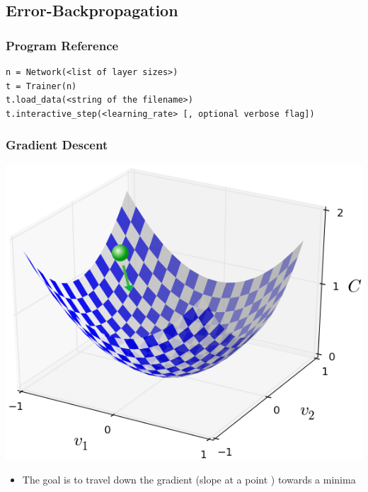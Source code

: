 \documentclass{beamer}
\makeatletter
\newcommand{\verbatimfont}[1]{\renewcommand{\verbatim@font}{\ttfamily#1}}
\makeatother
\begin{document}
    \subsection{Error-Backpropagation}
\begin{frame}[fragile]
    \frametitle{Program Reference}
    \begin{example}
        \verbatimfont{\scriptsize}
        \begin{verbatim}
n = Network(<list of layer sizes>)
t = Trainer(n)
t.load_data(<string of the filename>)
t.interactive_step(<learning_rate> [, optional verbose flag])
        \end{verbatim}
    \end{example}
\end{frame}
\begin{frame}
    \frametitle{Gradient Descent}
    \begin{center}
        \includegraphics[scale=.15]{descent}
    \end{center}
    \begin{itemize}
        \item The goal is to travel down the gradient (slope at a point ) towards a minima
    \end{itemize}
\end{frame}
\end{document}
